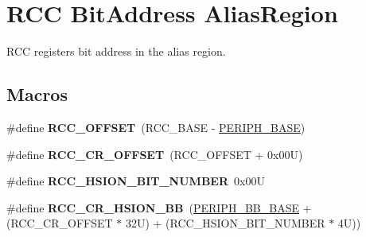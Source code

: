 \hypertarget{group___r_c_c___bit_address___alias_region}{}\section{R\+CC Bit\+Address Alias\+Region}
\label{group___r_c_c___bit_address___alias_region}


R\+CC registers bit address in the alias region.  


\subsection*{Macros}
\begin{DoxyCompactItemize}
\item 
\mbox{\label{group___r_c_c___bit_address___alias_region_ga539e07c3b3c55f1f1d47231341fb11e1}} 
\#define {\bfseries R\+C\+C\+\_\+\+O\+F\+F\+S\+ET}~(R\+C\+C\+\_\+\+B\+A\+SE -\/ \hyperlink{group___peripheral__memory__map_ga9171f49478fa86d932f89e78e73b88b0}{P\+E\+R\+I\+P\+H\+\_\+\+B\+A\+SE})
\item 
\mbox{\label{group___r_c_c___bit_address___alias_region_ga6df8d81c05c07cb0c26bbf27ea7fe55c}} 
\#define {\bfseries R\+C\+C\+\_\+\+C\+R\+\_\+\+O\+F\+F\+S\+ET}~(R\+C\+C\+\_\+\+O\+F\+F\+S\+ET + 0x00\+U)
\item 
\mbox{\label{group___r_c_c___bit_address___alias_region_ga9bf60daa74224ea82d3df7e08d4533f1}} 
\#define {\bfseries R\+C\+C\+\_\+\+H\+S\+I\+O\+N\+\_\+\+B\+I\+T\+\_\+\+N\+U\+M\+B\+ER}~0x00U
\item 
\mbox{\label{group___r_c_c___bit_address___alias_region_gabd3eca3cc8b1501f9d8a62c4a0ebcfe7}} 
\#define {\bfseries R\+C\+C\+\_\+\+C\+R\+\_\+\+H\+S\+I\+O\+N\+\_\+\+BB}~(\hyperlink{group___peripheral__memory__map_gaed7efc100877000845c236ccdc9e144a}{P\+E\+R\+I\+P\+H\+\_\+\+B\+B\+\_\+\+B\+A\+SE} + (R\+C\+C\+\_\+\+C\+R\+\_\+\+O\+F\+F\+S\+ET $\ast$ 32\+U) + (\+R\+C\+C\+\_\+\+H\+S\+I\+O\+N\+\_\+\+B\+I\+T\+\_\+\+N\+U\+M\+B\+E\+R $\ast$ 4\+U))
\item 
\mbox{\label{group___r_c_c___bit_address___alias_region_gaa8a1695db870d271a9e79bf0272ec8b6}} 

\end{DoxyCompactItemize}
